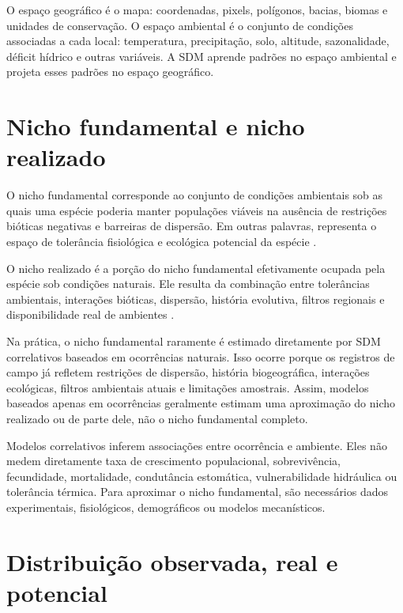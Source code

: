 \begin{conceito}
O espaço geográfico é o mapa: coordenadas, pixels, polígonos, bacias, biomas e unidades de conservação. O espaço ambiental é o conjunto de condições associadas a cada local: temperatura, precipitação, solo, altitude, sazonalidade, déficit hídrico e outras variáveis. A SDM aprende padrões no espaço ambiental e projeta esses padrões no espaço geográfico.
\end{conceito}

\section{Nicho fundamental e nicho realizado}

O nicho fundamental corresponde ao conjunto de condições ambientais sob as quais uma espécie poderia manter populações viáveis na ausência de restrições bióticas negativas e barreiras de dispersão. Em outras palavras, representa o espaço de tolerância fisiológica e ecológica potencial da espécie \parencite{hutchinson1957,pulliam2000,soberon2005}.

O nicho realizado é a porção do nicho fundamental efetivamente ocupada pela espécie sob condições naturais. Ele resulta da combinação entre tolerâncias ambientais, interações bióticas, dispersão, história evolutiva, filtros regionais e disponibilidade real de ambientes \parencite{pulliam2000,soberon2009}.

Na prática, o nicho fundamental raramente é estimado diretamente por SDM correlativos baseados em ocorrências naturais. Isso ocorre porque os registros de campo já refletem restrições de dispersão, história biogeográfica, interações ecológicas, filtros ambientais atuais e limitações amostrais. Assim, modelos baseados apenas em ocorrências geralmente estimam uma aproximação do nicho realizado ou de parte dele, não o nicho fundamental completo.

\begin{atencao}
Modelos correlativos inferem associações entre ocorrência e ambiente. Eles não medem diretamente taxa de crescimento populacional, sobrevivência, fecundidade, mortalidade, condutância estomática, vulnerabilidade hidráulica ou tolerância térmica. Para aproximar o nicho fundamental, são necessários dados experimentais, fisiológicos, demográficos ou modelos mecanísticos.
\end{atencao}

\section{Distribuição observada, real e potencial}

